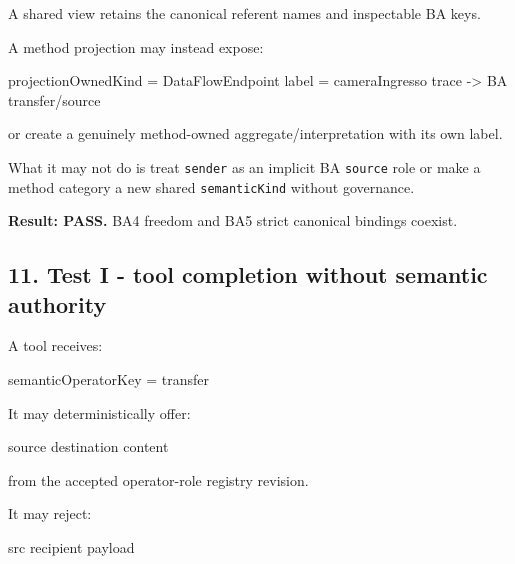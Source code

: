\documentclass[
  10pt,
  a4paper,
]{article}
\newenvironment{Shaded}{}{}
\newcommand{\NormalTok}[1]{#1}
\begin{document}
A shared view retains the canonical referent names and inspectable BA
keys.

A method projection may instead expose:

\begin{Shaded}
\begin{Highlighting}[]
\NormalTok{projectionOwnedKind = DataFlowEndpoint}
\NormalTok{label = cameraIngresso}
\NormalTok{trace {-}\textgreater{} BA transfer/source}
\end{Highlighting}
\end{Shaded}

or create a genuinely method-owned aggregate/interpretation with its own
label.

What it may not do is treat \texttt{sender} as an implicit BA
\texttt{source} role or make a method category a new shared
\texttt{semanticKind} without governance.

\textbf{Result: PASS.} BA4 freedom and BA5 strict canonical bindings
coexist.

\subsection{11. Test I - tool completion without semantic
authority}\label{test-i---tool-completion-without-semantic-authority}

A tool receives:

\begin{Shaded}
\begin{Highlighting}[]
\NormalTok{semanticOperatorKey = transfer}
\end{Highlighting}
\end{Shaded}

It may deterministically offer:

\begin{Shaded}
\begin{Highlighting}[]
\NormalTok{source}
\NormalTok{destination}
\NormalTok{content}
\end{Highlighting}
\end{Shaded}

from the accepted operator-role registry revision.

It may reject:

\begin{Shaded}
\begin{Highlighting}[]
\NormalTok{src}
\NormalTok{recipient}
\NormalTok{payload}
\end{Highlighting}
\end{Shaded}
\end{document}
